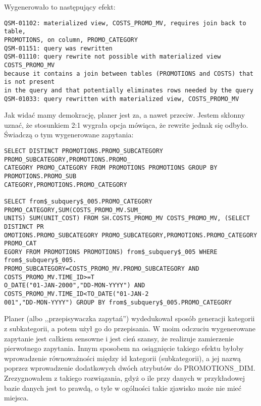 \documentclass[a4paper,11pt]{article}
\begin{document}
Wygenerowało to następujący efekt:
\begin{verbatim}
QSM-01102: materialized view, COSTS_PROMO_MV, requires join back to table, 
PROMOTIONS, on column, PROMO_CATEGORY
QSM-01151: query was rewritten
QSM-01110: query rewrite not possible with materialized view COSTS_PROMO_MV 
because it contains a join between tables (PROMOTIONS and COSTS) that is not present
in the query and that potentially eliminates rows needed by the query
QSM-01033: query rewritten with materialized view, COSTS_PROMO_MV
\end{verbatim}
Jak widać mamy demokrację, planer jest za, a nawet przeciw. Jestem skłonny uznać, że stosunkiem 2:1 wygrała opcja
mówiąca, że rewrite jednak się odbyło. Świadczą o tym wygenerowane zapytania:
\begin{verbatim}
SELECT DISTINCT PROMOTIONS.PROMO_SUBCATEGORY PROMO_SUBCATEGORY,PROMOTIONS.PROMO_
CATEGORY PROMO_CATEGORY FROM PROMOTIONS PROMOTIONS GROUP BY PROMOTIONS.PROMO_SUB
CATEGORY,PROMOTIONS.PROMO_CATEGORY                                              

SELECT from$_subquery$_005.PROMO_CATEGORY PROMO_CATEGORY,SUM(COSTS_PROMO_MV.SUM_
UNITS) SUM(UNIT_COST) FROM SH.COSTS_PROMO_MV COSTS_PROMO_MV, (SELECT DISTINCT PR
OMOTIONS.PROMO_SUBCATEGORY PROMO_SUBCATEGORY,PROMOTIONS.PROMO_CATEGORY PROMO_CAT
EGORY FROM PROMOTIONS PROMOTIONS) from$_subquery$_005 WHERE from$_subquery$_005.
PROMO_SUBCATEGORY=COSTS_PROMO_MV.PROMO_SUBCATEGORY AND COSTS_PROMO_MV.TIME_ID>=T
O_DATE("01-JAN-2000","DD-MON-YYYY") AND COSTS_PROMO_MV.TIME_ID<TO_DATE("01-JAN-2
001","DD-MON-YYYY") GROUP BY from$_subquery$_005.PROMO_CATEGORY
\end{verbatim}
Planer (albo ,,przepisywaczka zapytań'') wydedukował sposób generacji kategorii z subkategorii, a potem użył go do przepisania. W moim odczuciu wygenerowane zapytanie jest całkiem sensowne i jest cień szansy, że realizuje zamierzenie pierwotnego zapytania. Innym sposobem na osiągnięcie takiego efektu byłoby wprowadzenie równoważności między id kategorii (subkategorii), a jej nazwą poprzez wprowadzenie dodatkowych dwóch atrybutów do PROMOTIONS\_DIM. Zrezygnowałem z takiego rozwiązania, gdyż o ile przy danych w przykładowej bazie danych jest to prawdą, o tyle w ogólności takie zjawisko może nie mieć miejsca.
\end{document}

